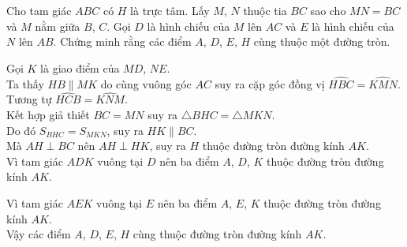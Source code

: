 \begin{bt}
 Cho tam giác $ABC$ có $H$ là trực tâm. Lấy $M$, $N$ thuộc tia $BC$ sao cho $MN=BC$ và $M$ nằm giữa $B$, $C$. Gọi $D$ là hình chiếu của $M$ lên $AC$ và $E$ là hình chiếu của $N$ lên $AB$. Chứng minh rằng các điểm $A$, $D$, $E$, $H$ cùng thuộc một đường tròn.
 \loigiai
  {
  \immini
  {
  Gọi $K$ là giao điểm của $MD$, $NE$.\\
  Ta thấy $HB \parallel MK$ do cùng vuông góc $AC$ suy ra cặp góc đồng vị $\widehat{HBC}=\widehat{KMN}$.\\
  Tương tự $\widehat{HCB}=\widehat{KNM}$.\\
  Kết hợp giả thiết $BC=MN$ suy ra $\triangle BHC = \triangle MKN$.\\
  Do đó $S_{BHC}=S_{MKN}$, suy ra $HK \parallel BC$.\\
  Mà $AH \perp BC$ nên $AH \perp HK$, suy ra $H$ thuộc đường tròn đường kính $AK$.\\
  Vì tam giác $ADK$ vuông tại $D$ nên ba điểm $A$, $D$, $K$ thuộc đường tròn đường kính $AK$.
  }
  {
  }
  \noindent Vì tam giác $AEK$ vuông tại $E$ nên ba điểm $A$, $E$, $K$ thuộc đường tròn đường kính $AK$.\\
  Vậy các điểm $A$, $D$, $E$, $H$ cùng thuộc đường tròn đường kính $AK$.
  }
\end{bt}

